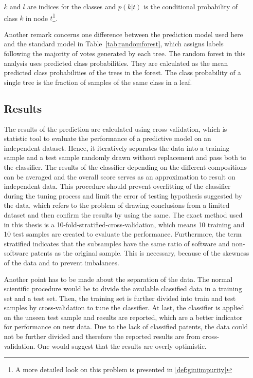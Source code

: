 \documentclass[12pt, a4paper]{scrartcl}
\theoremstyle{definition}
\begin{document}
$k$ and $l$ are indices for the classes and $p(k|t)$ is the conditional
probability of class $k$ in node $t$\footnote{A more detailed look on this
problem is presented in \ref{def:giniimpurity}}.

Another remark concerns one difference between the prediction model used here
and the standard model in Table~\ref{tab:randomforest}, which assigns labels
following the majority of votes generated by each tree. The random forest in
this analysis uses predicted class probabilities. They are calculated as the
mean predicted class probabilities of the trees in the forest. The class
probability of a single tree is the fraction of samples of the same class in a
leaf.


\subsection{Results} %
\label{sub:results}

The results of the prediction are calculated using cross-validation, which is
statistic tool to evaluate the performance of a predictive model on an
independent dataset. Hence, it iteratively separates the data into a training
sample and a test sample randomly drawn without replacement and pass both to
the classifier. The results of the classifier depending on the different
compositions can be averaged and the overall score serves as an approximation
to result on independent data. This procedure should prevent overfitting of the
classifier during the tuning process and limit the error of testing hypothesis
suggested by the data, which refers to the problem of drawing conclusions from
a limited dataset and then confirm the results by using the same. The exact
method used in this thesis is a 10-fold-stratified-cross-validation, which
means 10 training and 10 test samples are created to evaluate the performance.
Furthermore, the term stratified indicates that the subsamples have the same
ratio of software and non-software patents as the original sample. This is
necessary, because of the skewness of the data and to prevent imbalances.

Another point has to be made about the separation of the data. The normal
scientific procedure would be to divide the available classified data in a
training set and a test set. Then, the training set is further divided into
train and test samples by cross-validation to tune the classifier. At last, the
classifier is applied on the unseen test sample and results are reported, which
are a better indicator for performance on new data. Due to the lack of
classified patents, the data could not be further divided and therefore the
reported results are from cross-validation. One would suggest that the results
are overly optimistic.
\end{document}
